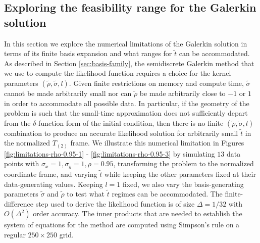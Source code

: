 \subsection{Exploring the feasibility range for the Galerkin
  solution} \label{sec:feasibility-range} In this section we explore
the numerical limitations of the Galerkin solution in terms of its
finite basis expansion and what ranges for $\tilde{t}$ can be
accommodated. As described in Section \ref{sec:basis-family}, the
semidiscrete Galerkin method that we use to compute the likelihood
function requires a choice for the kernel parameters
$(\tilde{\rho}, \tilde{\sigma}, l)$. Given finite restrictions on
memory and compute time, $\tilde{\sigma}$ cannot be made arbitrarily
small nor can $\tilde{\rho}$ be made arbitrarily close to $-1$ or $1$
in order to accommodate all possible data. In particular, if the
geometry of the problem is such that the small-time approximation does
not sufficiently depart from the $\delta$-function form of the initial
condition, then there is no finite $(\tilde{\rho}, \tilde{\sigma}, l)$
combination to produce an accurate likelihood solution for arbitrarily
small $\tilde{t}$ in the normalized $T_{(2)}$ frame. We illustrate
this numerical limitation in Figures \ref{fig:limitations-rho-0.95-1}
- \ref{fig:limitations-rho-0.95-3} by simulating $13$ data points with
$\sigma_x = 1, \sigma_y = 1, \rho = 0.95$, transforming the problem to
the normalized coordinate frame, and varying $\tilde{t}$ while keeping
the other parameters fixed at their data-generating values. Keeping
$l=1$ fixed, we also vary the basis-generating parameters
$\tilde{\sigma}$ and $\tilde{\rho}$ to test what $\tilde{t}$ regimes
can be accommodated. The finite-difference step used to derive the
likelihood function is of size $\Delta = 1/32$ with $O(\Delta^2)$
order accuracy. The inner products that are needed to establish the
system of equations for the method are computed using Simpson's rule
on a regular $250 \times 250$ grid.

